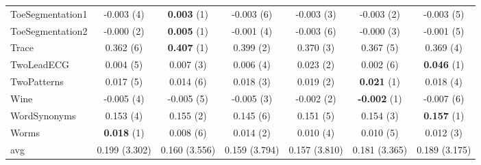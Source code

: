 \begin{table}[ht]
\begin{adjustbox}{width=\textwidth}
\begin{tabular}{lcccccc}
ToeSegmentation1 & -0.003 (4) & \textbf{0.003} (1) & -0.003 (6) & -0.003 (3) & -0.003 (2) & -0.003 (5) \\
ToeSegmentation2 & -0.000 (2) & \textbf{0.005} (1) & -0.001 (4) & -0.003 (6) & -0.000 (3) & -0.001 (5) \\
Trace & 0.362 (6) & \textbf{0.407} (1) & 0.399 (2) & 0.370 (3) & 0.367 (5) & 0.369 (4) \\
TwoLeadECG & 0.004 (5) & 0.007 (3) & 0.006 (4) & 0.023 (2) & 0.002 (6) & \textbf{0.046} (1) \\
TwoPatterns & 0.017 (5) & 0.014 (6) & 0.018 (3) & 0.019 (2) & \textbf{0.021} (1) & 0.018 (4) \\
Wine & -0.005 (4) & -0.005 (5) & -0.005 (3) & -0.002 (2) & \textbf{-0.002} (1) & -0.007 (6) \\
WordSynonyms & 0.153 (4) & 0.155 (2) & 0.145 (6) & 0.151 (5) & 0.154 (3) & \textbf{0.157} (1) \\
Worms & \textbf{0.018} (1) & 0.008 (6) & 0.014 (2) & 0.010 (4) & 0.010 (5) & 0.012 (3) \\
\hline 
avg & 0.199 (3.302) & 0.160 (3.556) & 0.159 (3.794) & 0.157 (3.810) & 0.181 (3.365) & 0.189 (3.175) \\ 
\hline
\end{tabular}
\end{adjustbox}
\end{table}